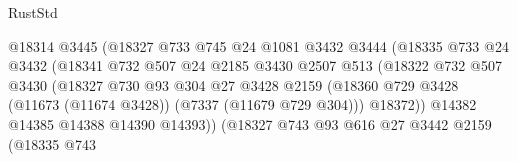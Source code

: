 \begin{lexlean}{RustStd}
\begin{coremodule}
                                      @18314
                                      @3445
                                      (@18327
                                        @733
                                        @745
                                        @24
                                        @1081
                                        @3432
                                        @3444
                                        (@18335
                                          @733
                                          @24
                                          @3432
                                          (@18341
                                            @732
                                            @507
                                            @24
                                            @2185
                                            @3430
                                            @2507
                                            @513
                                            (@18322
                                              @732
                                              @507
                                              @3430
                                              (@18327
                                                @730
                                                @93
                                                @304
                                                @27
                                                @3428
                                                @2159
                                                (@18360
                                                  @729
                                                  @3428
                                                  (@11673 (@11674 @3428))
                                                  (@7337 (@11679 @729 @304)))
                                                @18372))
                                            @14382
                                            @14385
                                            @14388
                                            @14390
                                            @14393))
                                        (@18327
                                          @743
                                          @93
                                          @616
                                          @27
                                          @3442
                                          @2159
                                          (@18335
                                            @743

\end{coremodule}
\end{lexlean}
